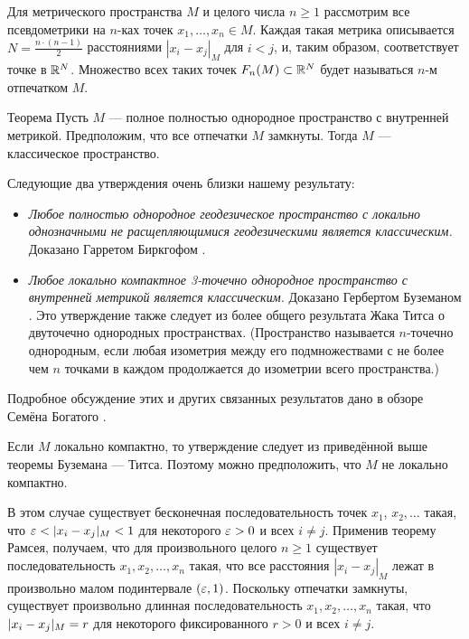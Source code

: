 \documentclass[a4paper,10pt]{article}
\begin{document}
Для метрического пространства $M$ и целого числа $n\ge1$ рассмотрим все псевдометрики на $n$-ках точек 
$x_1,\dots, x_n\in M$.
Каждая такая метрика описывается $N=\tfrac{n\cdot (n-1)}2$ расстояниями $|x_i-x_j|_M$ для $i<j$, и, таким образом, соответствует точке в $\mathbb{R}^N$.
Множество всех таких точек $F_n(M)\z\subset \RR^N$ будет называться $n$-м отпечатком $M$.

\begin{thm}{Теорема}\label{all-sets}
Пусть $M$ --- полное полностью однородное пространство с внутренней метрикой.
Предположим, что все отпечатки $M$ замкнуты.
Тогда $M$ --- классическое пространство.
\end{thm}

Следующие два утверждения очень близки нашему результату:
\begin{itemize}
\item \emph{Любое полностью однородное геодезическое пространство с локально однозначными не расщепляющимися геодезическими является классическим.} Доказано Гарретом Биркгофом  \cite{birkhoff}.
\item \emph{Любое локально компактное 3-точечно однородное пространство с внутренней метрикой  является классическим.} 
Доказано Гербертом Буземаном \cite{busemann}.
Это утверждение также следует из более общего результата Жака Титса \cite{tits} о двуточечно однородных пространствах.
(Пространство называется $n$-точечно однородным, если любая изометрия между его подмножествами с не более чем $n$ точками в каждом продолжается до изометрии всего пространства.)
\end{itemize}
Подробное обсуждение этих и других связанных результатов дано в обзоре Семёна Богатого \cite{bogaty-ru}.

Если $M$ локально компактно, то утверждение следует из приведённой выше теоремы Буземана --- Титса.
Поэтому можно предположить, что $M$ не локально компактно.

В этом случае существует бесконечная последовательность точек $x_1$, $x_2,\dots$ такая, что $\eps<|x_i-x_j|_M<1$ для некоторого $\varepsilon>0$ и всех $i\ne j$.
Применив теорему Рамсея, получаем, что для произвольного целого $n\ge 1$ существует последовательность $x_1,x_2,\dots,x_n$ такая, что все расстояния $|x_i-x_j|_M$ лежат в произвольно малом подинтервале $(\varepsilon,1)$.
Поскольку отпечатки замкнуты, существует произвольно длинная последовательность $x_1,x_2,\dots,x_n$ такая, что
$|x_i\z-x_j|_M= r$ для некоторого фиксированного $r>0$ и всех $i\ne j$.
\end{document}
